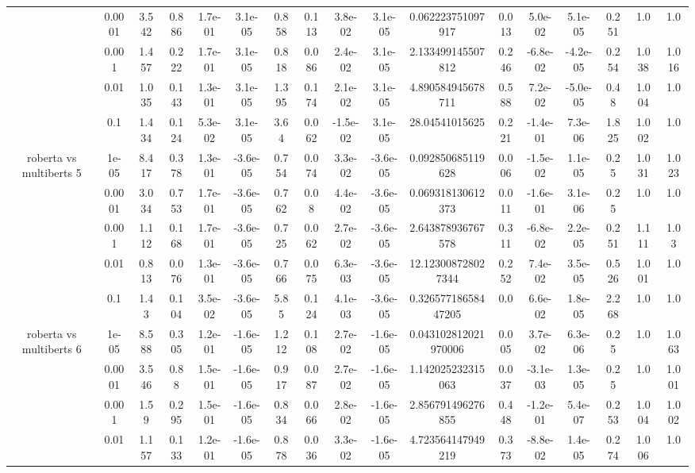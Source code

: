 \begin{tabular}{|c|c|c|c|c|c|c|c|c|c|c|c|c|c|c|c|c|}
 & 0.0001 & 3.542 & 0.886 & 1.7e-01 & 3.1e-05 & 0.858 & 0.113 & 3.8e-02 & 3.1e-05 & 0.062223751097917 & 0.013 & 5.0e-02 & 5.1e-05 & 0.251 & 1.0 & 1.0 \\
 & 0.001 & 1.457 & 0.222 & 1.7e-01 & 3.1e-05 & 0.818 & 0.086 & 2.4e-02 & 3.1e-05 & 2.133499145507812 & 0.246 & -6.8e-02 & -4.2e-05 & 0.254 & 1.038 & 1.016 \\
 & 0.01 & 1.035 & 0.143 & 1.3e-01 & 3.1e-05 & 1.395 & 0.174 & 2.1e-02 & 3.1e-05 & 4.890584945678711 & 0.588 & 7.2e-02 & -5.0e-05 & 0.48 & 1.004 & 1.0 \\
 & 0.1 & 1.434 & 0.124 & 5.3e-02 & 3.1e-05 & 3.64 & 0.062 & -1.5e-02 & 3.1e-05 & 28.04541015625 & 0.221 & -1.4e-01 & 7.3e-06 & 1.825 & 1.002 & 1.0 \\
\hline
\multirow{5}{*}{roberta  vs multiberts 5} & 1e-05 & 8.417 & 0.378 & 1.3e-01 & -3.6e-05 & 0.754 & 0.074 & 3.3e-02 & -3.6e-05 & 0.092850685119628 & 0.006 & -1.5e-02 & 1.1e-05 & 0.25 & 1.031 & 1.023 \\
 & 0.0001 & 3.034 & 0.753 & 1.7e-01 & -3.6e-05 & 0.762 & 0.08 & 4.4e-02 & -3.6e-05 & 0.069318130612373 & 0.011 & -1.6e-01 & 3.1e-06 & 0.25 & 1.0 & 1.0 \\
 & 0.001 & 1.112 & 0.168 & 1.7e-01 & -3.6e-05 & 0.725 & 0.062 & 2.7e-02 & -3.6e-05 & 2.643878936767578 & 0.311 & -6.8e-02 & 2.2e-05 & 0.251 & 1.111 & 1.03 \\
 & 0.01 & 0.813 & 0.076 & 1.3e-01 & -3.6e-05 & 0.766 & 0.075 & 6.3e-03 & -3.6e-05 & 12.123008728027344 & 0.252 & 7.4e-02 & 3.5e-05 & 0.526 & 1.001 & 1.0 \\
 & 0.1 & 1.43 & 0.104 & 3.5e-02 & -3.6e-05 & 5.85 & 0.124 & 4.1e-03 & -3.6e-05 & 0.32657718658447205 & 0.0 & 6.6e-02 & 1.8e-05 & 2.268 & 1.0 & 1.0 \\
\hline
\multirow{5}{*}{roberta  vs multiberts 6} & 1e-05 & 8.588 & 0.305 & 1.2e-01 & -1.6e-05 & 1.212 & 0.108 & 2.7e-02 & -1.6e-05 & 0.043102812021970006 & 0.005 & 3.7e-02 & 6.3e-06 & 0.25 & 1.0 & 1.063 \\
 & 0.0001 & 3.546 & 0.88 & 1.5e-01 & -1.6e-05 & 0.917 & 0.087 & 2.7e-02 & -1.6e-05 & 1.142025232315063 & 0.037 & -3.1e-03 & 1.3e-05 & 0.25 & 1.0 & 1.001 \\
 & 0.001 & 1.59 & 0.295 & 1.5e-01 & -1.6e-05 & 0.834 & 0.066 & 2.8e-02 & -1.6e-05 & 2.856791496276855 & 0.448 & -1.2e-01 & 5.4e-07 & 0.253 & 1.004 & 1.002 \\
 & 0.01 & 1.157 & 0.133 & 1.2e-01 & -1.6e-05 & 0.878 & 0.036 & 3.3e-02 & -1.6e-05 & 4.723564147949219 & 0.373 & -8.8e-02 & 1.4e-05 & 0.274 & 1.006 & 1.0 \\

\end{tabular}
